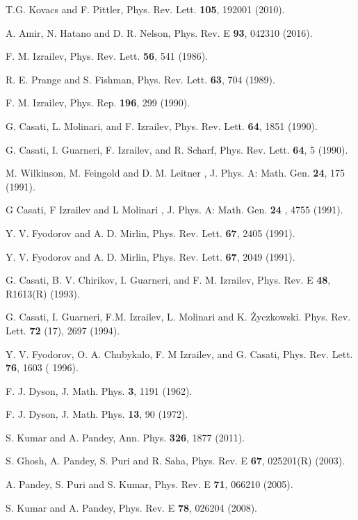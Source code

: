\documentclass[reprint,amsmath,amssymb,showpacs,aps,]{revtex4-1}
\begin{document}
{\begin{thebibliography}{9}
T.G. Kovacs and F. Pittler, Phys. Rev. Lett. \textbf{105}, 192001 (2010).

A. Amir, N. Hatano and D. R. Nelson, Phys. Rev. E \textbf{93}, 042310 (2016).

F. M. Izrailev, Phys. Rev. Lett. \textbf{56}, 541 (1986).

 R. E. Prange and S. Fishman, Phys. Rev. Lett. \textbf{63}, 704 (1989).

F. M. Izrailev, Phys. Rep. \textbf{196}, 299 (1990).

 G. Casati, L. Molinari, and F.  Izrailev, Phys. Rev. Lett. \textbf{64}, 1851 (1990).
 
 G. Casati, I. Guarneri, F. Izrailev, and R. Scharf, Phys. Rev. Lett. \textbf{64}, 5 (1990).
  
M. Wilkinson, M. Feingold  and D. M. Leitner ,  J. Phys. A: Math. Gen. \textbf{24}, 175 (1991).

 G Casati, F Izrailev and L Molinari , J. Phys. A: Math. Gen. \textbf{24} , 4755 (1991).

Y. V. Fyodorov and A. D. Mirlin, Phys. Rev. Lett. \textbf{67}, 2405  (1991).

Y. V. Fyodorov and A. D. Mirlin, Phys. Rev. Lett. \textbf{67}, 2049  (1991). 

G. Casati, B. V. Chirikov, I. Guarneri, and F. M. Izrailev, Phys. Rev. E \textbf{48}, R1613(R) (1993).
 
G. Casati, I. Guarneri, F.M. Izrailev, L. Molinari and K. Życzkowski.
Phys. Rev. Lett. \textbf{72} (17), 2697 (1994).

Y. V. Fyodorov, O. A. Chubykalo, F. M Izrailev, and G. Casati,
Phys. Rev. Lett. \textbf{76}, 1603 ( 1996).

F. J. Dyson, J. Math. Phys. \textbf{3}, 1191 (1962).

F. J. Dyson, J. Math. Phys. \textbf{13}, 90 (1972).

S. Kumar and A. Pandey, Ann. Phys. \textbf{326}, 1877 (2011).

S. Ghosh, A. Pandey, S. Puri and R. Saha, Phys. Rev. E \textbf{67}, 025201(R) (2003).

A. Pandey, S. Puri and S. Kumar, Phys. Rev. E \textbf{71}, 066210 (2005).

S. Kumar and A. Pandey, Phys. Rev. E \textbf{78}, 026204 (2008).


\end{thebibliography}}
\end{document}
